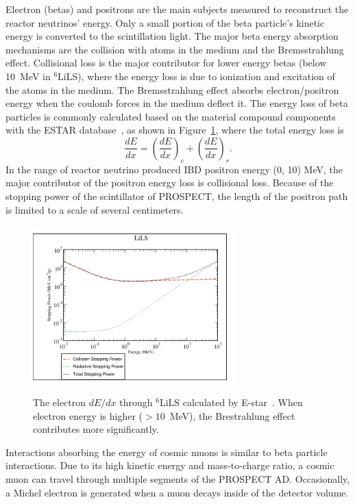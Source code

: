 \label{sec:511}
Electron (betas) and positrons are the main subjects measured to reconstruct the reactor neutrinos' energy.
Only a small portion of the beta particle's kinetic energy is converted to the scintillation light. 
The major beta energy absorption mechanisms are the collision with atoms in the medium and the Bremsstrahlung effect.
Collisional loss is the major contributor for lower energy betas (below 10~MeV in $^6$LiLS), where the energy loss is due to ionization and excitation of the atoms in the medium.
The Bremsstrahlung effect absorbs electron/positron energy when the coulomb forces in the medium deflect it.
The energy loss of beta particles is commonly calculated based on the material compound components with the ESTAR database~\cite{bib:estar}, as shown in Figure~\ref{fig:EStar},
where the total energy loss is
\begin{equation}
\label{eq:dedx}
\frac{dE}{dx} = (\frac{dE}{dx})_c + (\frac{dE}{dx})_r.
\end{equation}
In the range of reactor neutrino produced IBD positron energy (0, 10) MeV, the major contributor of the positron energy loss is collisional loss. 
Because of the stopping power of the scintillator of PROSPECT, the length of the positron path is limited to a scale of several centimeters.

\begin{figure}[h!]
    \centering
    \includegraphics[width=0.7\textwidth]{Figures/ESTAR.png}\\
    \caption[Electron energy loss in $^6$LiLS]{The electron $dE/dx$ through $^6$LiLS calculated by E-star~\cite{bib:estar}.
    When electron energy is higher ($> 10$~MeV), the Brestrahlung effect contributes more significantly.}
    \label{fig:EStar}
\end{figure}

Interactions absorbing the energy of cosmic muons is similar to beta particle interactions. 
Due to its high kinetic energy and mass-to-charge ratio, a cosmic muon can travel through multiple segments of the PROSPECT AD.
Occasionally, a Michel electron is generated when a muon decays inside of the detector volume.

